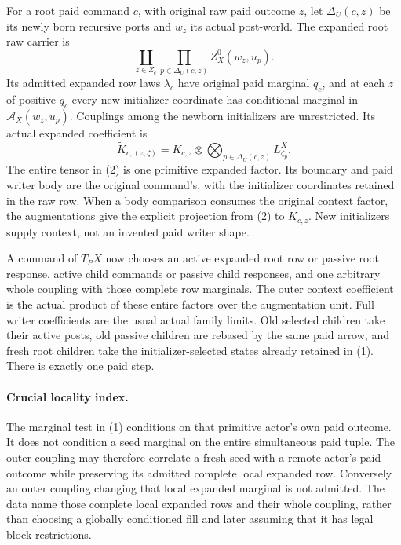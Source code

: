 \documentclass[11pt]{article}
\begin{document}
For a root paid command $c$, with original raw paid outcome $z$, let $\Delta_U(c,z)$ be its newly born recursive ports and $w_z$ its actual post-world. The expanded root raw carrier is
\[
 \coprod_{z\in Z_c}\prod_{p\in\Delta_U(c,z)}Z_X^0(w_z,u_p).       \tag{1}
\]
Its admitted expanded row laws $\lambda_c$ have original paid marginal $q_c$, and at each $z$ of positive $q_c$ every new initializer coordinate has conditional marginal in $\mathcal A_X(w_z,u_p)$. Couplings among the newborn initializers are unrestricted. Its actual expanded coefficient is
\[
 \widetilde K_{c,(z,\zeta)}=K_{c,z}\otimes
                  \bigotimes_{p\in\Delta_U(c,z)}L^X_{\zeta_p}. \tag{2}
\]
The entire tensor in (2) is one primitive expanded factor. Its boundary and paid writer body are the original command's, with the initializer coordinates retained in the raw row. When a body comparison consumes the original context factor, the augmentations give the explicit projection from (2) to $K_{c,z}$. New initializers supply context, not an invented paid writer shape.

A command of $T_PX$ now chooses an active expanded root row or passive root response, active child commands or passive child responses, and one arbitrary whole coupling with those complete row marginals. The outer context coefficient is the actual product of these entire factors over the augmentation unit. Full writer coefficients are the usual actual family limits. Old selected children take their active posts, old passive children are rebased by the same paid arrow, and fresh root children take the initializer-selected states already retained in (1). There is exactly one paid step.

\paragraph{Crucial locality index.} The marginal test in (1) conditions on that primitive actor's own paid outcome. It does not condition a seed marginal on the entire simultaneous paid tuple. The outer coupling may therefore correlate a fresh seed with a remote actor's paid outcome while preserving its admitted complete local expanded row. Conversely an outer coupling changing that local expanded marginal is not admitted. The data name those complete local expanded rows and their whole coupling, rather than choosing a globally conditioned fill and later assuming that it has legal block restrictions.
\end{document}
